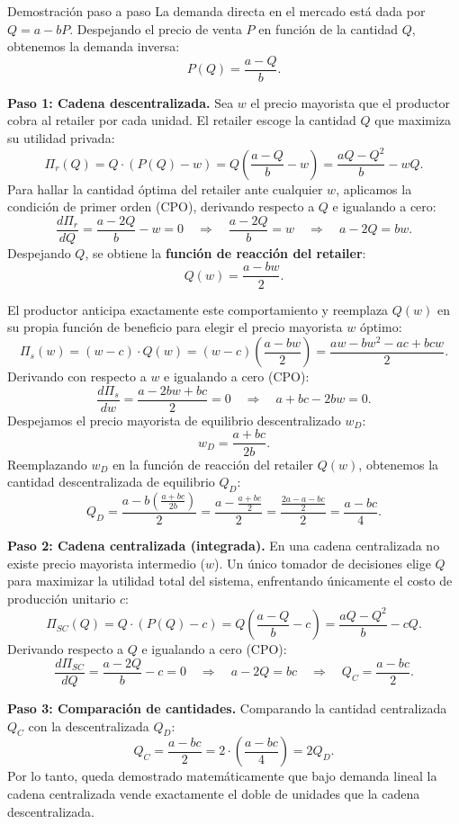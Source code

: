 \documentclass[11pt,a4paper]{article}
\begin{document}
\begin{pauta}{Demostración paso a paso}
La demanda directa en el mercado está dada por \(Q = a - bP\). Despejando el precio de venta \(P\) en función de la cantidad \(Q\), obtenemos la demanda inversa:
\[
P(Q) = \frac{a - Q}{b}.
\]

\textbf{Paso 1: Cadena descentralizada.}
Sea \(w\) el precio mayorista que el productor cobra al retailer por cada unidad. El retailer escoge la cantidad \(Q\) que maximiza su utilidad privada:
\[
\Pi_r(Q) = Q \cdot (P(Q) - w) = Q \left( \frac{a - Q}{b} - w \right) = \frac{aQ - Q^2}{b} - wQ.
\]
Para hallar la cantidad óptima del retailer ante cualquier \(w\), aplicamos la condición de primer orden (CPO), derivando respecto a \(Q\) e igualando a cero:
\[
\frac{d\Pi_r}{dQ} = \frac{a - 2Q}{b} - w = 0 
\quad\Rightarrow\quad \frac{a - 2Q}{b} = w 
\quad\Rightarrow\quad a - 2Q = bw.
\]
Despejando \(Q\), se obtiene la \textbf{función de reacción del retailer}:
\[
Q(w) = \frac{a - bw}{2}.
\]

El productor anticipa exactamente este comportamiento y reemplaza \(Q(w)\) en su propia función de beneficio para elegir el precio mayorista \(w\) óptimo:
\[
\Pi_s(w) = (w - c) \cdot Q(w) = (w - c) \left( \frac{a - bw}{2} \right) = \frac{aw - bw^2 - ac + bcw}{2}.
\]
Derivando con respecto a \(w\) e igualando a cero (CPO):
\[
\frac{d\Pi_s}{dw} = \frac{a - 2bw + bc}{2} = 0 
\quad\Rightarrow\quad a + bc - 2bw = 0.
\]
Despejamos el precio mayorista de equilibrio descentralizado \(w_D\):
\[
w_D = \frac{a + bc}{2b}.
\]
Reemplazando \(w_D\) en la función de reacción del retailer \(Q(w)\), obtenemos la cantidad descentralizada de equilibrio \(Q_D\):
\[
Q_D = \frac{a - b \left(\frac{a + bc}{2b}\right)}{2} 
= \frac{a - \frac{a + bc}{2}}{2} 
= \frac{\frac{2a - a - bc}{2}}{2} 
= \frac{a - bc}{4}.
\]

\textbf{Paso 2: Cadena centralizada (integrada).}
En una cadena centralizada no existe precio mayorista intermedio (\(w\)). Un único tomador de decisiones elige \(Q\) para maximizar la utilidad total del sistema, enfrentando únicamente el costo de producción unitario \(c\):
\[
\Pi_{SC}(Q) = Q \cdot (P(Q) - c) = Q \left( \frac{a - Q}{b} - c \right) = \frac{aQ - Q^2}{b} - cQ.
\]
Derivando respecto a \(Q\) e igualando a cero (CPO):
\[
\frac{d\Pi_{SC}}{dQ} = \frac{a - 2Q}{b} - c = 0 
\quad\Rightarrow\quad a - 2Q = bc 
\quad\Rightarrow\quad Q_C = \frac{a - bc}{2}.
\]

\textbf{Paso 3: Comparación de cantidades.}
Comparando la cantidad centralizada \(Q_C\) con la descentralizada \(Q_D\):
\[
Q_C = \frac{a - bc}{2} = 2 \cdot \left( \frac{a - bc}{4} \right) = 2 Q_D.
\]
Por lo tanto, queda demostrado matemáticamente que bajo demanda lineal la cadena centralizada vende exactamente el doble de unidades que la cadena descentralizada.
\end{pauta}
\end{document}
